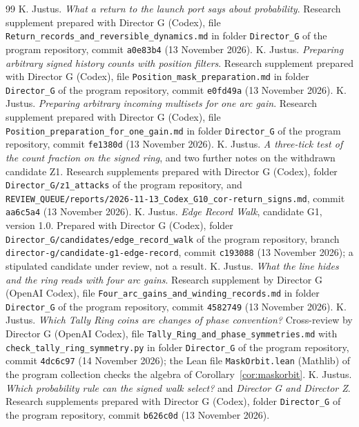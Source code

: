 \documentclass[11pt,a4paper]{article}
\begin{document}
\begin{thebibliography}{99}
 K. Justus. \emph{What a return to the launch port says about probability}. Research supplement prepared with Director G (Codex), file \texttt{Return\_records\_and\_reversible\_dynamics.md} in folder \texttt{Director\_G} of the program repository, commit \texttt{a0e83b4} (13 November 2026).
 K. Justus. \emph{Preparing arbitrary signed history counts with position filters}. Research supplement prepared with Director G (Codex), file \texttt{Position\_mask\_preparation.md} in folder \texttt{Director\_G} of the program repository, commit \texttt{e0fd49a} (13 November 2026).
 K. Justus. \emph{Preparing arbitrary incoming multisets for one arc gain}. Research supplement prepared with Director G (Codex), file \texttt{Position\_preparation\_for\_one\_gain.md} in folder \texttt{Director\_G} of the program repository, commit \texttt{fe1380d} (13 November 2026).
 K. Justus. \emph{A three-tick test of the count fraction on the signed ring}, and two further notes on the withdrawn candidate Z1. Research supplements prepared with Director G (Codex), folder \texttt{Director\_G/z1\_attacks} of the program repository, and \texttt{REVIEW\_QUEUE/reports/2026-11-13\_Codex\_G10\_cor-return\_signs.md}, commit \texttt{aa6c5a4} (13 November 2026).
 K. Justus. \emph{Edge Record Walk}, candidate G1, version 1.0. Prepared with Director G (Codex), folder \texttt{Director\_G/candidates/edge\_record\_walk} of the program repository, branch \texttt{director-g/candidate-g1-edge-record}, commit \texttt{c193088} (13 November 2026); a stipulated candidate under review, not a result.
 K. Justus. \emph{What the line hides and the ring reads with four arc gains}. Research supplement by Director G (OpenAI Codex), file \texttt{Four\_arc\_gains\_and\_winding\_records.md} in folder \texttt{Director\_G} of the program repository, commit \texttt{4582749} (13 November 2026).
 K. Justus. \emph{Which Tally Ring coins are changes of phase convention?} Cross-review by Director G (OpenAI Codex), file \texttt{Tally\_Ring\_and\_phase\_symmetries.md} with \texttt{check\_tally\_ring\_symmetry.py} in folder \texttt{Director\_G} of the program repository, commit \texttt{4dc6c97} (14 November 2026); the Lean file \texttt{MaskOrbit.lean} (Mathlib) of the program collection checks the algebra of Corollary~\ref{cor:maskorbit}.
 K. Justus. \emph{Which probability rule can the signed walk select?} and \emph{Director G and Director Z}. Research supplements prepared with Director G (Codex), folder \texttt{Director\_G} of the program repository, commit \texttt{b626c0d} (13 November 2026).

\end{thebibliography}
\end{document}
